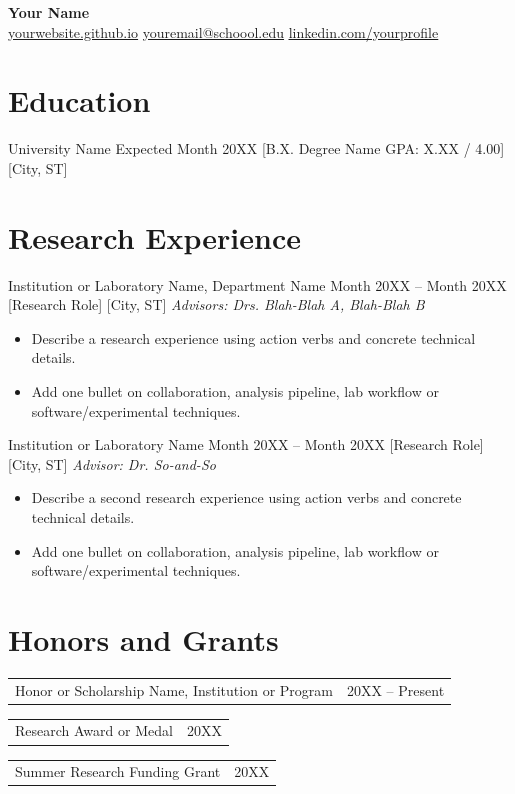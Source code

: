 \documentclass[letterpaper,11pt]{article}
\makeatletter
\newcommand{\resumeSimpleHeading}[2]{%
  \begin{tabularx}{\textwidth}{@{}X>{\RaggedLeft\arraybackslash}p{0.28\textwidth}@{}}
    #1 & #2 \\
  \end{tabularx}
}
\newcommand{\resumeItem}[1]{\item #1}
\makeatother
\begin{document}
\begin{center}
  \textbf{\LARGE Your Name}\\[0.35em]
  \href{https://yourwebsite.github.io/}{\underline{yourwebsite.github.io}} \textbullet{} \href{mailto:youremail@school.edu}{\underline{youremail@schoool.edu}} \textbullet{} \href{https://linkedin.com/in/yourprofile}{\underline{linkedin.com/yourprofile}}
\end{center}

\section*{Education}
\resumeSubheading
  {University Name}
  {Expected Month 20XX}
  [B.X. Degree Name \textbar{} GPA: X.XX / 4.00]
  [City, ST]

\vspace{-1.5em}
\section*{Research Experience}
\resumeSubheading
  {Institution or Laboratory Name, Department Name}
  {Month 20XX -- Month 20XX}
  [Research Role]
  [City, ST]
\textit{Advisors: Drs. Blah-Blah A, Blah-Blah B}
\begin{itemize}
  \resumeItem{Describe a research experience using action verbs and concrete technical details.}
  \resumeItem{Add one bullet on collaboration, analysis pipeline, lab workflow or software/experimental techniques.}
\end{itemize}

\vspace{0.5em}
\resumeSubheading
  {Institution or Laboratory Name}
  {Month 20XX -- Month 20XX}
  [Research Role]
  [City, ST]
\textit{Advisor: Dr. So-and-So}
\begin{itemize}
  \resumeItem{Describe a second research experience using action verbs and concrete technical details.}
  \resumeItem{Add one bullet on collaboration, analysis pipeline, lab workflow or software/experimental techniques.}
\end{itemize}

\vspace{-1em}
\section*{Honors and Grants}
\resumeSimpleHeading{Honor or Scholarship Name, Institution or Program}{20XX -- Present}
\resumeSimpleHeading{Research Award or Medal}{20XX}
\resumeSimpleHeading{Summer Research Funding Grant}{20XX}
\end{document}
